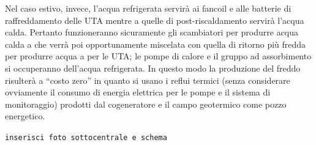 Nel caso estivo, invece, l'acqua refrigerata servirà ai fancoil e alle batterie di raffreddamento delle UTA mentre a quelle di post-riscaldamento servirà l'acqua calda. Pertanto funzioneranno sicuramente gli scambiatori per produrre acqua calda a  che verrà poi opportunamente miscelata con quella di ritorno più fredda per produrre acqua a  per le UTA; le pompe di calore e il gruppo ad assorbimento si occuperanno dell'acqua refrigerata. In questo modo la produzione del freddo risulterà a ``costo zero'' in quanto si usano i reflui termici (senza considerare ovviamente il consumo di energia elettrica per le pompe e il sistema di monitoraggio) prodotti dal cogeneratore e il campo geotermico come pozzo energetico.

\texttt{inserisci foto sottocentrale e schema}
